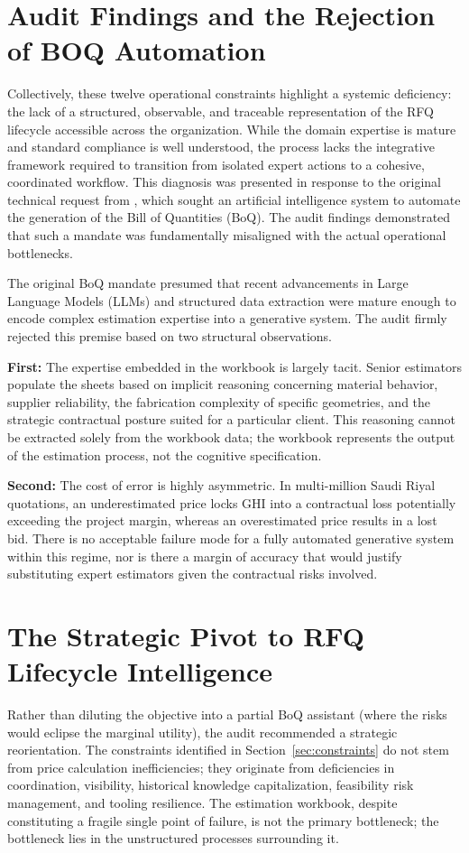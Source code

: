 \section{Audit Findings and the Rejection of BOQ Automation}\label{sec:audit_findings}
Collectively, these twelve operational constraints highlight a systemic deficiency: the lack of a structured, observable, and traceable representation of the RFQ lifecycle accessible across the organization. While the domain expertise is mature and standard compliance is well understood, the process lacks the integrative framework required to transition from isolated expert actions to a cohesive, coordinated workflow. This diagnosis was presented in response to the original technical request from \clientCompany, which sought an artificial intelligence system to automate the generation of the Bill of Quantities (BoQ). The audit findings demonstrated that such a mandate was fundamentally misaligned with the actual operational bottlenecks.

The original BoQ mandate presumed that recent advancements in Large Language Models (LLMs) and structured data extraction were mature enough to encode complex estimation expertise into a generative system. The audit firmly rejected this premise based on two structural observations.

\textbf{First:} The expertise embedded in the workbook is largely tacit. Senior estimators populate the sheets based on implicit reasoning concerning material behavior, supplier reliability, the fabrication complexity of specific geometries, and the strategic contractual posture suited for a particular client. This reasoning cannot be extracted solely from the workbook data; the workbook represents the output of the estimation process, not the cognitive specification.

\textbf{Second:} The cost of error is highly asymmetric. In multi-million Saudi Riyal quotations, an underestimated price locks GHI into a contractual loss potentially exceeding the project margin, whereas an overestimated price results in a lost bid. There is no acceptable failure mode for a fully automated generative system within this regime, nor is there a margin of accuracy that would justify substituting expert estimators given the contractual risks involved.

\section{The Strategic Pivot to RFQ Lifecycle Intelligence}\label{sec:strategic_pivot}
Rather than diluting the objective into a partial BoQ assistant (where the risks would eclipse the marginal utility), the audit recommended a strategic reorientation. The constraints identified in Section~\ref{sec:constraints} do not stem from price calculation inefficiencies; they originate from deficiencies in coordination, visibility, historical knowledge capitalization, feasibility risk management, and tooling resilience. The estimation workbook, despite constituting a fragile single point of failure, is not the primary bottleneck; the bottleneck lies in the unstructured processes surrounding it.

